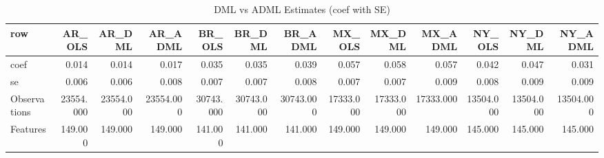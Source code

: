 \begin{table}

\caption{DML vs ADML Estimates (coef with SE)}
\centering
\begin{tabular}[t]{lrrrrrrrrrrrr}
\toprule
row & AR\_OLS & AR\_DML & AR\_ADML & BR\_OLS & BR\_DML & BR\_ADML & MX\_OLS & MX\_DML & MX\_ADML & NY\_OLS & NY\_DML & NY\_ADML\\
\midrule
coef & 0.014 & 0.014 & 0.017 & 0.035 & 0.035 & 0.039 & 0.057 & 0.058 & 0.057 & 0.042 & 0.047 & 0.031\\
se & 0.006 & 0.006 & 0.008 & 0.007 & 0.007 & 0.008 & 0.007 & 0.007 & 0.009 & 0.008 & 0.009 & 0.009\\
Observations & 23554.000 & 23554.000 & 23554.000 & 30743.000 & 30743.000 & 30743.000 & 17333.000 & 17333.000 & 17333.000 & 13504.000 & 13504.000 & 13504.000\\
Features & 149.000 & 149.000 & 149.000 & 141.000 & 141.000 & 141.000 & 149.000 & 149.000 & 149.000 & 145.000 & 145.000 & 145.000\\
\bottomrule
\end{tabular}
\end{table}
